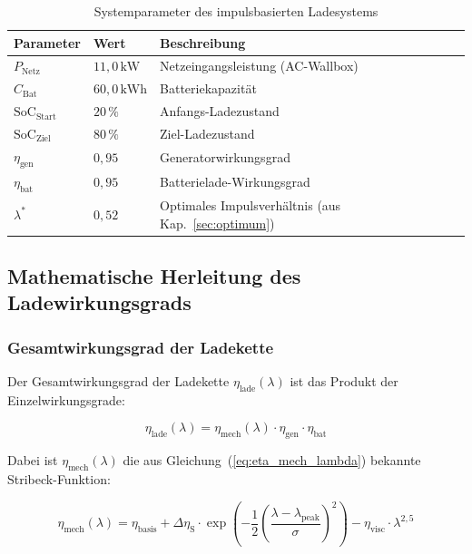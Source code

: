 ﻿\documentclass[a4paper,12pt]{article}
\begin{document}
\begin{table}[htbp]
  \centering
  \caption{Systemparameter des impulsbasierten Ladesystems}
  \label{tab:evparams}
  \begin{tabular}{lll}
    \toprule
    \textbf{Parameter} & \textbf{Wert} & \textbf{Beschreibung} \\
    \midrule
    $P_\text{Netz}$ & $11{,}0\,\text{kW}$ & Netzeingangsleistung (AC-Wallbox) \\
    $C_\text{Bat}$  & $60{,}0\,\text{kWh}$ & Batteriekapazität \\
    $\text{SoC}_\text{Start}$ & $20\,\%$ & Anfangs-Ladezustand \\
    $\text{SoC}_\text{Ziel}$  & $80\,\%$ & Ziel-Ladezustand \\
    $\eta_\text{gen}$ & $0{,}95$ & Generatorwirkungsgrad \\
    $\eta_\text{bat}$ & $0{,}95$ & Batterielade-Wirkungsgrad \\
    $\lambda^*$       & $0{,}52$ & Optimales Impulsverhältnis (aus Kap.~\ref{sec:optimum}) \\
    \bottomrule
  \end{tabular}
\end{table}

\subsection{Mathematische Herleitung des Ladewirkungsgrads}

\subsubsection{Gesamtwirkungsgrad der Ladekette}

Der Gesamtwirkungsgrad der Ladekette $\eta_\text{lade}(\lambda)$ ist das
Produkt der Einzelwirkungsgrade:

\begin{equation}
  \eta_\text{lade}(\lambda) = \eta_\text{mech}(\lambda)
    \cdot \eta_\text{gen} \cdot \eta_\text{bat}
  \label{eq:eta_lade}
\end{equation}

Dabei ist $\eta_\text{mech}(\lambda)$ die aus Gleichung~(\ref{eq:eta_mech_lambda})
bekannte Stribeck-Funktion:

\begin{equation}
  \eta_\text{mech}(\lambda) = \eta_\text{basis}
    + \Delta\eta_\text{S} \cdot
      \exp\!\left(-\frac{1}{2}\left(\frac{\lambda - \lambda_\text{peak}}
      {\sigma}\right)^2\right)
    - \eta_\text{visc} \cdot \lambda^{2{,}5}
  \label{eq:stribeck_ev}
\end{equation}
\end{document}
